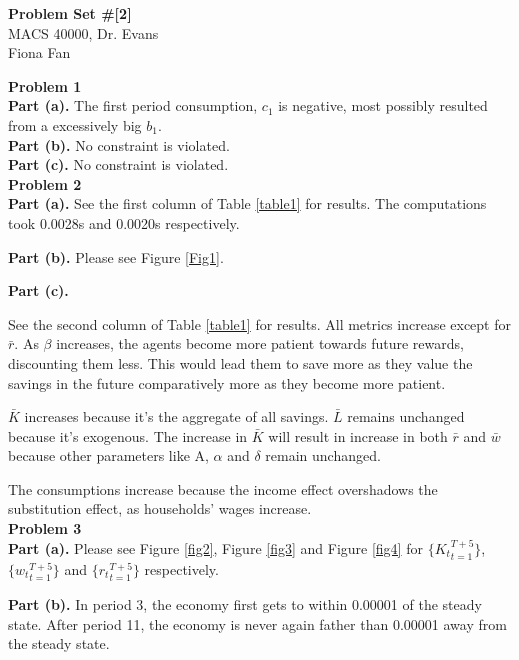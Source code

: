 \documentclass[letterpaper,12pt]{article}
\theoremstyle{definition}
\begin{document}
\begin{flushleft}
  \textbf{\large{Problem Set \#[2]}} \\
  MACS 40000, Dr. Evans \\
  Fiona Fan
\end{flushleft}

\vspace{5mm}

\noindent\textbf{Problem 1}
\\ \textbf{Part (a).} The first period consumption, $c_1$ is negative, most possibly resulted from a excessively big $b_1$.
\\ \textbf{Part (b).} No constraint is violated.
\\ \textbf{Part (c).} No constraint is violated.\\




\noindent\textbf{Problem 2} \\
\textbf{Part (a).} See the first column of Table \ref{table1} for results. The computations took 0.0028s and 0.0020s respectively.

\textbf{Part (b).} Please see Figure \ref{Fig1}. 

\textbf{Part (c).} \par See the second column of Table \ref{table1} for results. All metrics increase except for $\bar{r}$. As $\beta$ increases, the agents become more patient towards future rewards, discounting them less. This would lead them to save more as they value the savings in the future comparatively more as they become more patient. \par $\bar{K}$ increases because it's the aggregate of all savings. $\bar{L}$ remains unchanged because it's exogenous. The increase in $\bar{K}$ will result in increase in both $\bar{r}$ and $\bar{w}$ because other parameters like A, $\alpha$ and $\delta$ remain unchanged. \par The consumptions increase because the income effect overshadows the substitution effect, as households' wages increase.\\ 


\noindent\textbf{Problem 3}\\
\textbf{Part (a).} Please see Figure \ref{fig2}, Figure \ref{fig3} and Figure \ref{fig4} for $\{{K_t}_{t=1}^{T+5}\}$, $\{{w_t}_{t=1}^{T+5}\}$ and $\{{r_t}_{t=1}^{T+5}\}$ respectively.


\noindent\textbf{Part (b).} In period 3, the economy first gets to within 0.00001 of the steady state. After period 11, the economy is never again father than 0.00001 away from the steady state.
\end{document}

